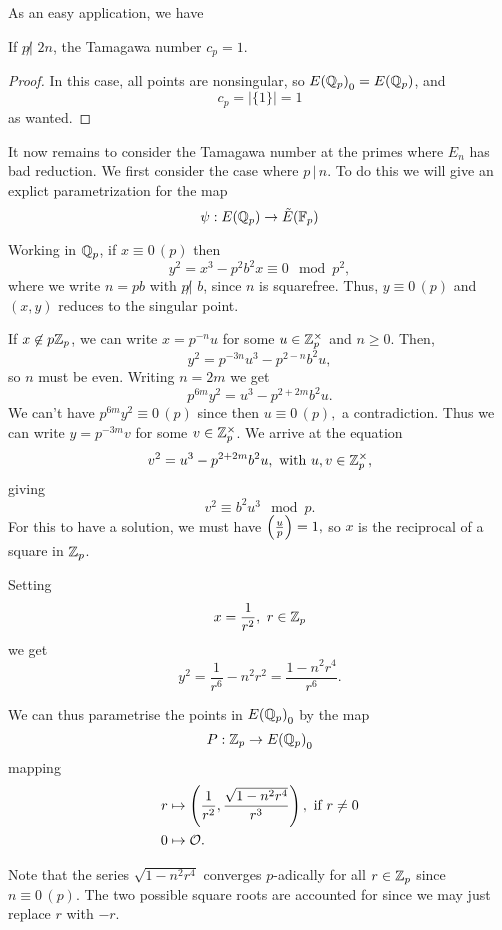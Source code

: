 \documentclass[12pt, a4paper]{report}
\begin{document}
As an easy application, we have

\begin{cor}
  If $p \not| \,\, 2n$, the Tamagawa number $c_p = 1$.
\end{cor}

\begin{proof}
  In this case, all points are nonsingular, so ${E({\mathbb Q}_p)}_0 = {E({\mathbb Q}_p)}$, and
  \[c_p = \left| \{1\} \right| = 1\]
  as wanted.
\end{proof}

It now remains to consider the Tamagawa number at the primes where $E_n$ has
bad reduction. We first consider the case where $p \, | \, n$. To do this
we will give an explict parametrization for the map
\[\psi : {E({\mathbb Q}_p)} \rightarrow {\tilde{E}(\mathbb{F}_p)}\]

Working in ${\mathbb Q}_p$, if $x \equiv 0 \, (p)$ then
\[y^2 = x^3 - p^{2}b^2 x \equiv 0 \mod{p^2}, \]
where we write $n = p b$ with $p \not| \,\, b $, since $n$ is squarefree.
Thus, $y \equiv 0 \, (p)$ and $(x,y)$ reduces to the singular point.

If $x \not\in p {\mathbb Z}_p$, we can write $x = p^{-n} u$ for some $u \in
{\mathbb Z}_p^\times$ and $n \geq 0$. Then,
\[y^2 = p^{-3n}u^3 - p^{2-n}b^2u,\]
so $n$ must be even. Writing $n = 2m$ we get
\[p^{6m}y^2 = u^3 - p^{2+2m}b^2u.\]
We can't have $p^{6m}y^2 \equiv 0 \, (p)$ since then
$u \equiv 0 \, (p),$ a contradiction. Thus we can write
$y = p^{-3m}v$ for some $v \in \mathbb{Z}_p^\times$. We arrive at the equation
\[v^2 = u^3 - p^{2+2m}b^2u, \text{ with } u, v \in \mathbb{Z}_p^\times,\]
giving
\[v^2 \equiv b^2u^3 \mod{p}.\]
For this to have a solution, we must have $\left(\frac{u}{p}\right) = 1,$
so $x$ is the reciprocal of a square in ${\mathbb Z}_p$.

Setting 
\[x = \frac{1}{r^2}, \,\, r \in {\mathbb Z}_p\]
we get
\[y^2 = \frac{1}{r^6}-{n^2}{r^2} = \frac{1-n^2r^4}{r^6}.\]

We can thus parametrise the points in ${E({\mathbb Q}_p)}_0$ by the map
\[
    P : {\mathbb Z}_p \rightarrow {E({\mathbb Q}_p)}_0  \]
mapping
\begin{equation} \label{eq:p-param}
  \begin{split}
    r &\mapsto \left(\frac{1}{r^2}, \frac{\sqrt{1-n^2r^4}}{r^3}\right), 
\text{ if } r \neq 0 \\
    0 &\mapsto {\mathcal O}.
  \end{split}
\end{equation}

Note that the series $\sqrt{1 -n^2r^4}$ converges $p$-adically for all $r \in
{\mathbb Z}_p$ since $n \equiv 0 \, (p)$. The two possible square roots are accounted
for since we may just replace $r$ with $-r.$
\end{document}

